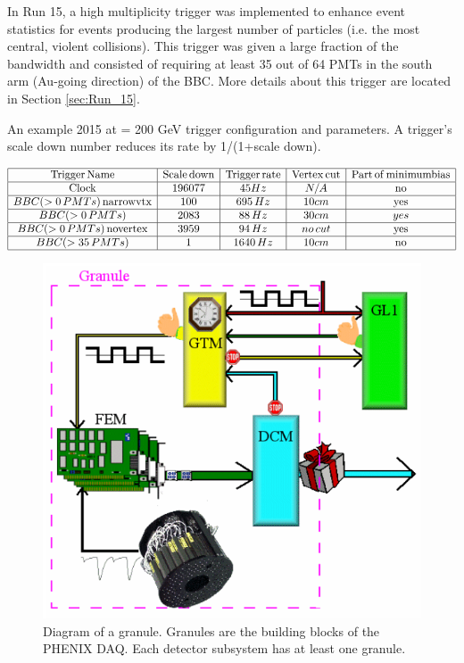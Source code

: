 In Run 15, a high multiplicity trigger was implemented to enhance event statistics for events producing the largest number of particles (i.e. the most central, violent collisions). This trigger was given a large fraction of the bandwidth and consisted of requiring at least 35 out of 64 PMTs in the south arm (Au-going direction) of the BBC. More details about this trigger are located in Section \ref{sec:Run_15}.
\begin{table}[h!]
\centering
\caption{An example 2015 \pau at \sqsn = 200 GeV trigger configuration and parameters. A trigger's scale down number reduces its rate by 1/(1+scale down). }%
    $\begin{array}{|c|c|c|c|c|}
    \hline 
    \rm Trigger\thinspace \rm Name & \rm Scale\thinspace \rm down & \rm Trigger\thinspace \rm rate & \rm Vertex\thinspace \rm cut & \rm Part\thinspace \rm of\thinspace \rm minimum \rm bias \\ \hline
     \rm Clock & 196077 & 45 Hz  & N/A & \rm no \\ \hline
    BBC(>0\thinspace PMTs)\thinspace \rm narrowvtx& 100 &  695\thinspace Hz &  10 cm & \rm yes\\ \hline
    BBC(>0\thinspace PMTs)  & 2083 & 88\thinspace Hz &  30 cm & yes\\ \hline
    BBC(>0\thinspace PMTs)\thinspace \rm novertex& 3959 &94\thinspace Hz  &no\thinspace cut & \rm yes\\ \hline
    BBC(>35\thinspace  PMTs) & 1 & 1640\thinspace Hz &  10 cm & \rm no \\ \hline
    \end{array}$
\label{tbl:trigger_config}
\end{table}

\begin{figure}[!ht]
\centering
\includegraphics[width=0.55\linewidth]{figs/granule_diagram.png}
\caption{Diagram of a granule. Granules are the building blocks of the PHENIX DAQ. Each detector subsystem has at least one granule.} %
\label{fig:granule_diag}
\end{figure}

